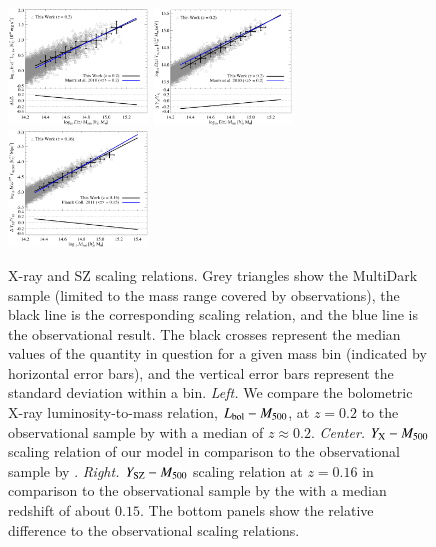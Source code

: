 \documentclass[useAMS,usenatbib]{mn2e}
\begin{document}
\begin{figure} 
\centering
\includegraphics[width=0.33\textwidth]{figures/lx_m.eps}
\includegraphics[width=0.33\textwidth]{figures/yx_m.eps}
\includegraphics[width=0.33\textwidth]{figures/sz_m.eps}
\caption{X-ray and SZ scaling relations. Grey triangles show the MultiDark
  sample (limited to the mass range covered by observations), the black line is
  the corresponding scaling relation, and the blue line is the
  observational result. The black crosses represent the median values of the
  quantity in question for a given mass bin (indicated by horizontal error
  bars), and the vertical error bars represent the standard deviation within a
  bin.  \emph{Left.} We compare the bolometric X-ray luminosity-to-mass
  relation, $L_{{\mathrm{bol}}}-M_{500}$, at $z=0.2$ to the observational sample by
  \protect\cite{2010MNRAS.406.1773M} with a median of $z \approx 0.2$. \emph{Center.}
  $Y_{{\mathrm{X}}}-M_{500}$ scaling relation of our model in comparison to the
  observational sample by \protect\cite{2010MNRAS.406.1773M}. \emph{Right.}
  $Y_{{\mathrm{SZ}}}-M_{500}$ scaling relation at $z=0.16$ in comparison
  to the observational sample by the \protect\cite{2011A&A...536A..11P} with a median
  redshift of about $0.15$. The bottom panels show the relative difference to
  the observational scaling relations.}
\label{fig:X_LM}
\end{figure}
\end{document}
